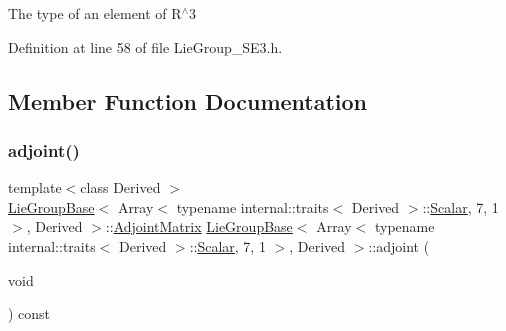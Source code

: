 The type of an element of R$^\wedge$3 

Definition at line 58 of file Lie\+Group\+\_\+\+S\+E3.\+h.



\subsection{Member Function Documentation}
\hypertarget{class_lie_group_base_3_01_array_3_01typename_01internal_1_1traits_3_01_derived_01_4_1_1_scalar_0d6d4b5459662fc32c7117aee50362fb1_afb91190c18be04ae1dc8b9e6e7cee1f2}{}\label{class_lie_group_base_3_01_array_3_01typename_01internal_1_1traits_3_01_derived_01_4_1_1_scalar_0d6d4b5459662fc32c7117aee50362fb1_afb91190c18be04ae1dc8b9e6e7cee1f2} 
\subsubsection{\texorpdfstring{adjoint()}{adjoint()}\hspace{0.1cm}{\footnotesize\ttfamily [1/2]}}
{\footnotesize\ttfamily template$<$class Derived $>$ \\
\hyperlink{class_lie_group_base}{Lie\+Group\+Base}$<$ Array$<$ typename internal\+::traits$<$ Derived $>$\+::\hyperlink{class_lie_group_base_3_01_array_3_01typename_01internal_1_1traits_3_01_derived_01_4_1_1_scalar_0d6d4b5459662fc32c7117aee50362fb1_a831695c575380c9a1df32eff9fc4a8c6}{Scalar}, 7, 1 $>$, Derived $>$\+::\hyperlink{class_lie_group_base_3_01_array_3_01typename_01internal_1_1traits_3_01_derived_01_4_1_1_scalar_0d6d4b5459662fc32c7117aee50362fb1_a0321ba973250771361f7c4b431042308}{Adjoint\+Matrix} \hyperlink{class_lie_group_base}{Lie\+Group\+Base}$<$ Array$<$ typename internal\+::traits$<$ Derived $>$\+::\hyperlink{class_lie_group_base_3_01_array_3_01typename_01internal_1_1traits_3_01_derived_01_4_1_1_scalar_0d6d4b5459662fc32c7117aee50362fb1_a831695c575380c9a1df32eff9fc4a8c6}{Scalar}, 7, 1 $>$, Derived $>$\+::adjoint (\begin{DoxyParamCaption}\item[{void}]{ }\end{DoxyParamCaption}) const}

